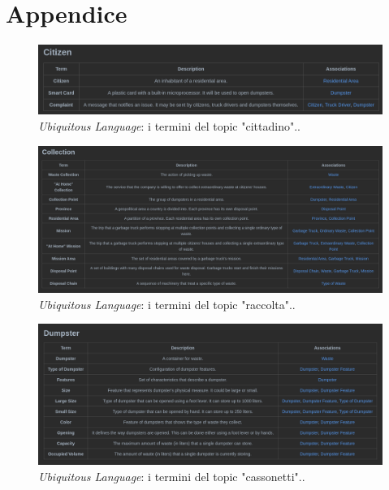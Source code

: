 \section*{Appendice}

\begin{figure}[H]
    \centering
    \includegraphics[width=\textwidth]{../img/citizen-ubiquitous-language.pm}
    \caption{\textit{Ubiquitous Language}: i termini del topic "cittadino"..}
    \label{fig:citizen-ubiquitous-language}
\end{figure}

\begin{figure}[H]
    \centering
    \includegraphics[width=\textwidth]{../img/collection-ubiquitous-language.pm}
    \caption{\textit{Ubiquitous Language}: i termini del topic "raccolta"..}
    \label{fig:collection-ubiquitous-language}
\end{figure}

\begin{figure}[H]
    \centering
    \includegraphics[width=\textwidth]{../img/dumpster-ubiquitous-language.pm}
    \caption{\textit{Ubiquitous Language}: i termini del topic "cassonetti"..}
    \label{fig:dumpster-ubiquitous-language}
\end{figure}

